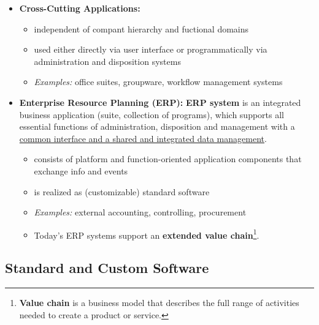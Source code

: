 \documentclass[ieeetran]{article}
\begin{document}
\begin{itemize}
\begin{itemize}
\end{itemize}
\item \textbf{Cross-Cutting Applications:}
	\begin{itemize}
	  \item independent of compant hierarchy and fuctional domains
	\item used either directly via user interface or programmatically via administration and disposition systems
	\item \textit{Examples:} office suites, groupware, workflow management systems
	\end{itemize}

\item \textbf{Enterprise Resource Planning (ERP):} \textbf{ERP system} is an integrated business application (suite, collection of programs), which supports all essential functions of administration, disposition and management with a \underline{common interface and a shared and integrated data management}.
	\begin{itemize}
	  \item consists of platform and function-oriented application components that exchange info and events
          \item is realized as (customizable) standard software
	\item \textit{Examples:} external accounting, controlling, procurement
	\item Today's ERP systems support an \textbf{extended value chain}\footnote{\textbf{Value chain} is a business model that describes the full range of activities needed to create a product or service.}.
	\end{itemize}
\end{itemize}

\subsection{Standard and Custom Software} %
\label{sub:standard_and_custom_software}
\end{document}
